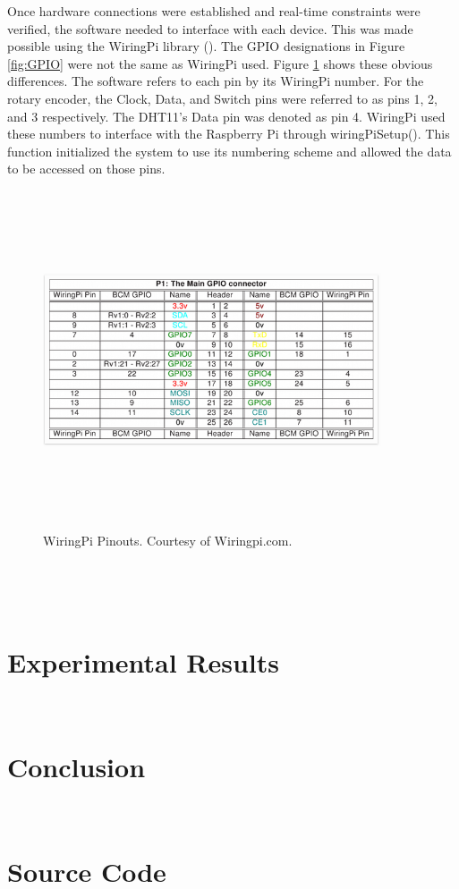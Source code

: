 \documentclass[letterpaper, 12pt]{article}
\begin{document}
Once hardware connections were established and real-time constraints were verified, the software needed to interface with each device.  This was made possible using the WiringPi library (\cite{gordonhenderson2018}).  The GPIO designations in Figure \ref{fig:GPIO} were not the same as WiringPi used.  Figure \ref{fig:pinouts} shows these obvious differences. The software refers to each pin by its WiringPi number.  For the rotary encoder, the Clock, Data, and Switch pins were referred to as pins 1, 2, and 3 respectively.  The DHT11's Data pin was denoted as pin 4.  WiringPi used these numbers to interface with the Raspberry Pi through wiringPiSetup().  This function initialized the system to use its numbering scheme and allowed the data to be accessed on those pins.

\begin{figure}[H]
	\centering
	\includegraphics[width=10cm,height=10cm,keepaspectratio]{pi_pins.png}
	\caption[Pinouts]{WiringPi Pinouts. Courtesy of Wiringpi.com.}
	\label{fig:pinouts}
\end{figure}
~\newline

~\newpage
\section{Experimental Results}
~\newpage
\section{Conclusion}

~\newpage
\printbibliography
~\newpage
\section{Source Code}

\end{document}
